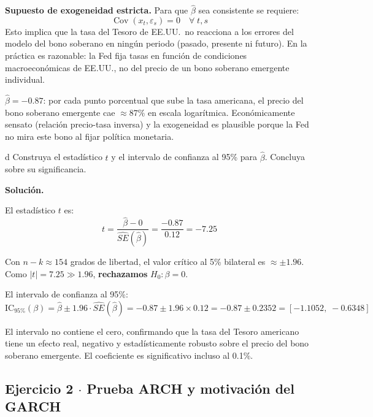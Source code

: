\documentclass[11pt,a4paper]{article}
\newcommand{\Cov}{\operatorname{Cov}}
\newcommand{\eps}{\varepsilon}
\begin{document}
\textbf{Supuesto de exogeneidad estricta.} Para que $\hat{\beta}$ sea consistente se requiere:
\[
\Cov(x_t, \eps_s) = 0 \quad \forall\; t, s
\]
Esto implica que la tasa del Tesoro de EE.UU.\ no reacciona a los errores del modelo del bono soberano en ningún periodo (pasado, presente ni futuro). En la práctica es razonable: la Fed fija tasas en función de condiciones macroeconómicas de EE.UU., no del precio de un bono soberano emergente individual.

\begin{cajaHallazgo}
$\hat{\beta} = -0.87$: por cada punto porcentual que sube la tasa americana, el precio del bono soberano emergente cae $\approx 87\%$ en escala logarítmica. Económicamente sensato (relación precio-tasa inversa) y la exogeneidad es plausible porque la Fed no mira este bono al fijar política monetaria.
\end{cajaHallazgo}

\begin{cajaInciso}{d}
Construya el estadístico $t$ y el intervalo de confianza al 95\% para $\hat{\beta}$. Concluya sobre su significancia.
\end{cajaInciso}

\textbf{Solución.}

El estadístico $t$ es:
\[
t = \frac{\hat{\beta} - 0}{\widehat{SE}(\hat{\beta})} = \frac{-0.87}{0.12} = -7.25
\]

Con $n - k \approx 154$ grados de libertad, el valor crítico al 5\% bilateral es $\approx \pm 1.96$. Como $|t| = 7.25 \gg 1.96$, \textbf{rechazamos} $H_0: \beta = 0$.

El intervalo de confianza al 95\%:
\[
\text{IC}_{95\%}(\beta) = \hat{\beta} \pm 1.96 \cdot \widehat{SE}(\hat{\beta})
= -0.87 \pm 1.96 \times 0.12
= -0.87 \pm 0.2352
= [-1.1052,\; -0.6348]
\]

El intervalo no contiene el cero, confirmando que la tasa del Tesoro americano tiene un efecto real, negativo y estadísticamente robusto sobre el precio del bono soberano emergente. El coeficiente es significativo incluso al 0.1\%.

\subsection*{Ejercicio 2 \texorpdfstring{$\cdot$}{·} Prueba ARCH y motivación del GARCH}
\end{document}
